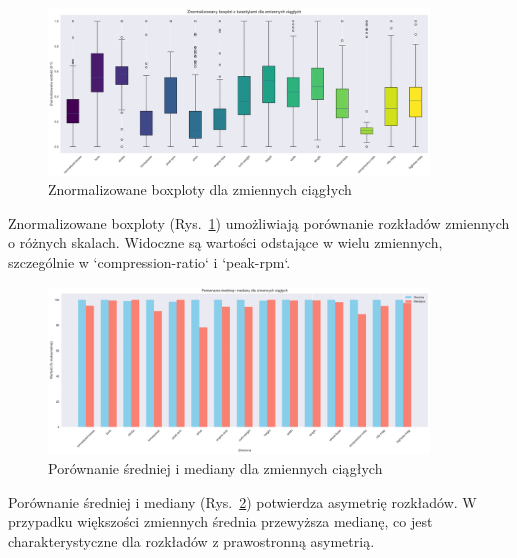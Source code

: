 \documentclass[12pt,a4paper]{article}
\begin{document}
\begin{figure}[H]
    \centering
    \includegraphics[width=0.9\textwidth]{figures/boxplots_znormalizowane.png}
    \caption{Znormalizowane boxploty dla zmiennych ciągłych}
    \label{fig:boxplots_znormalizowane}
\end{figure}

Znormalizowane boxploty (Rys.~\ref{fig:boxplots_znormalizowane}) umożliwiają porównanie rozkładów zmiennych o różnych skalach. Widoczne są wartości odstające w wielu zmiennych, szczególnie w `compression-ratio` i `peak-rpm`.

\begin{figure}[H]
    \centering
    \includegraphics[width=0.9\textwidth]{figures/srednia_vs_mediana.png}
    \caption{Porównanie średniej i mediany dla zmiennych ciągłych}
    \label{fig:srednia_vs_mediana}
\end{figure}

Porównanie średniej i mediany (Rys.~\ref{fig:srednia_vs_mediana}) potwierdza asymetrię rozkładów. W przypadku większości zmiennych średnia przewyższa medianę, co jest charakterystyczne dla rozkładów z prawostronną asymetrią.
\end{document}
